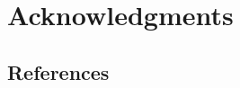 \documentclass[9pt,twocolumn,twoside,lineno]{pnas-new}
\begin{document}

\section{Acknowledgments}









\subsection*{References}
\printbibliography

\end{document}

